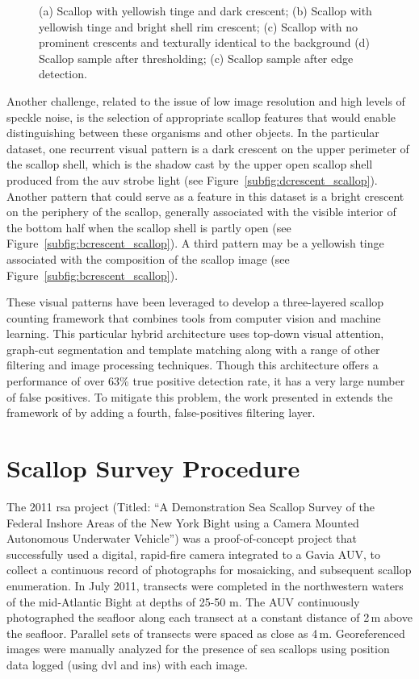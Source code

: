\documentclass {udthesis}
\begin{document}
\begin{figure}
\begin{subfigure}[]{0.17\textwidth}
      \caption{}
      \label{subfig:edge_scallop}
  \end{subfigure}
\caption{\cite{prasanna_igi} (a) Scallop with yellowish tinge and dark crescent; (b) Scallop with yellowish tinge and bright shell rim crescent; (c) Scallop with no prominent crescents and texturally identical to the background (d) Scallop sample after thresholding; (c) Scallop sample after edge detection.
}
\end{figure}

Another challenge, related to the issue of low image resolution and high levels of speckle noise, is the selection of appropriate scallop features that would enable distinguishing between these organisms and other objects. 
In the particular dataset, one recurrent visual pattern is a dark crescent on the upper perimeter of the scallop shell, which is the shadow cast by the upper open scallop shell produced from the \gls{auv} strobe light (see Figure~\ref{subfig:dcrescent_scallop}). 
Another pattern that could serve as a feature in this dataset is a bright crescent on the periphery of the scallop, generally associated with the visible interior of the bottom half when the scallop shell is partly open (see Figure~\ref{subfig:bcrescent_scallop}).
A third pattern may be a yellowish tinge associated with the composition of the scallop image (see Figure~\ref{subfig:bcrescent_scallop}).

These visual patterns have been leveraged \cite{prasanna_aslo} to develop a three-layered scallop counting framework  that combines tools from computer vision and machine learning. 
This particular hybrid architecture uses top-down visual attention, graph-cut segmentation and template matching along with a range of other filtering and image processing techniques. 
Though this architecture offers a performance of over 63\% true positive detection rate, it has a very large number of false positives. 
To mitigate this problem, the work presented in \cite{prasanna_igi} extends the framework of \cite{prasanna_aslo} by adding a fourth, false-positives filtering layer.

\section{Scallop Survey Procedure}

The 2011 \gls{rsa} 
project (Titled: ``A Demonstration Sea Scallop Survey of the 
Federal Inshore Areas of the New York Bight using a Camera Mounted Autonomous Underwater
 Vehicle'')
was a proof-of-concept project that successfully used a digital, rapid-fire camera integrated 
to a Gavia AUV, to collect a continuous record of photographs for mosaicking, 
and subsequent scallop enumeration. 
In July 2011, transects were completed in the northwestern waters of the mid-Atlantic 
Bight at depths of 25-50 m.  The AUV continuously photographed the 
seafloor along each transect at a constant distance of 2\,m above the seafloor.  
Parallel sets of transects were spaced as close as 4\,m.  
Georeferenced images were manually analyzed for the presence of sea scallops 
using position data logged (using \gls{dvl} and \gls{ins}) with each image.
%
\end{document}
